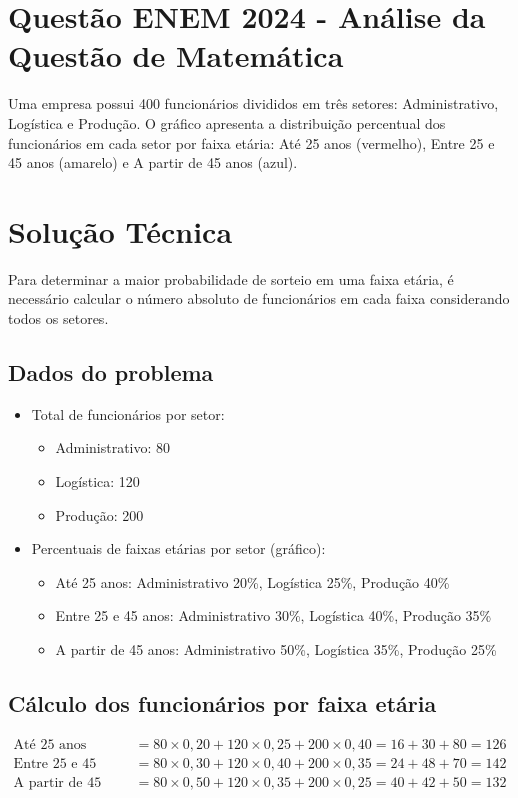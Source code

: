 \documentclass{article}
\begin{document}
\section*{Questão ENEM 2024 - Análise da Questão de Matemática}

Uma empresa possui 400 funcionários divididos em três setores: Administrativo, Logística e Produção. O gráfico apresenta a distribuição percentual dos funcionários em cada setor por faixa etária: Até 25 anos (vermelho), Entre 25 e 45 anos (amarelo) e A partir de 45 anos (azul).

\section{Solução Técnica}

Para determinar a maior probabilidade de sorteio em uma faixa etária, é necessário calcular o número absoluto de funcionários em cada faixa considerando todos os setores.

\subsection{Dados do problema}
\begin{itemize}
  \item Total de funcionários por setor:
  \begin{itemize}
    \item Administrativo: 80
    \item Logística: 120
    \item Produção: 200
  \end{itemize}
  \item Percentuais de faixas etárias por setor (gráfico):
  \begin{itemize}
    \item Até 25 anos: Administrativo 20\%, Logística 25\%, Produção 40\%
    \item Entre 25 e 45 anos: Administrativo 30\%, Logística 40\%, Produção 35\%
    \item A partir de 45 anos: Administrativo 50\%, Logística 35\%, Produção 25\%
  \end{itemize}
\end{itemize}

\subsection{Cálculo dos funcionários por faixa etária}
\begin{align*}
\text{Até 25 anos} &= 80 \times 0,20 + 120 \times 0,25 + 200 \times 0,40 = 16 + 30 + 80 = 126 \\
\text{Entre 25 e 45 anos} &= 80 \times 0,30 + 120 \times 0,40 + 200 \times 0,35 = 24 + 48 + 70 = 142 \\
\text{A partir de 45 anos} &= 80 \times 0,50 + 120 \times 0,35 + 200 \times 0,25 = 40 + 42 + 50 = 132
\end{align*}
\end{document}
